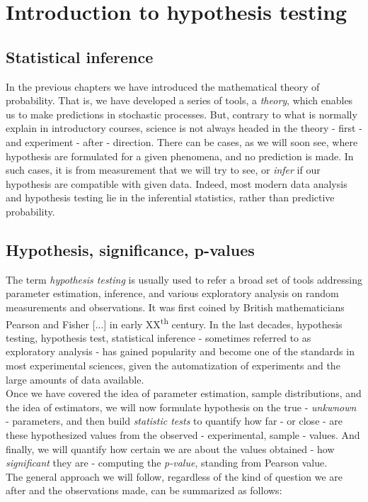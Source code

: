 \documentclass{book}
\begin{document}
\chapter{Introduction to hypothesis testing}

\section{Statistical inference}
In the previous chapters we have introduced the mathematical theory of probability. That is, we have developed a series of tools, a \textit{theory}, which enables us to make predictions in stochastic processes. But, contrary to what is normally explain in introductory courses, science is not always headed in the theory - first - and experiment - after - direction. There can be cases, as we will soon see, where hypothesis are formulated for a given phenomena, and no prediction is made. In such cases, it is from measurement that we will try to see, or \textit{infer} if our hypothesis are compatible with given data. Indeed, most modern data analysis and hypothesis testing lie in the inferential statistics, rather than predictive probability.

\section{Hypothesis, significance, p-values}
The term \textit{hypothesis testing} is usually used to refer a broad set of tools addressing parameter estimation, inference, and various exploratory analysis on random measurements and observations. It was first coined by British mathematicians Pearson and Fisher [...] in early XX\textsuperscript{th} century. In the last decades, hypothesis testing, hypothesis test, statistical inference - sometimes referred to as  exploratory analysis - has gained popularity and become one of the standards in most experimental sciences, given the automatization of experiments and the large amounts of data available.\\

Once we have covered the idea of parameter estimation, sample distributions, and the idea of estimators, we will now formulate hypothesis on the true - \textit{unkwnown} - parameters, and then build \textit{statistic tests} to quantify how far - or close - are these hypothesized values from the observed - experimental, sample - values. And finally, we will quantify how certain we are about the values obtained - how \textit{significant} they are - computing the \textit{p-value}, standing from Pearson value.\\ The general approach we will follow, regardless of the kind of question we are after and the observations made, can be summarized as follows:
\end{document}
